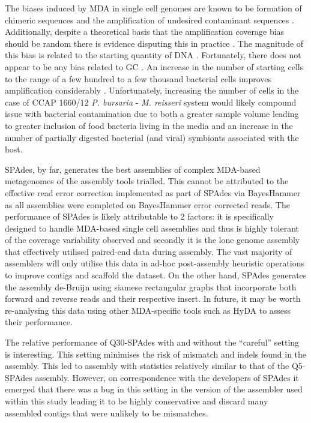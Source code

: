 The biases induced by MDA in single cell genomes are known to be 
formation of chimeric sequences and the amplification
of undesired contaminant sequences \citep{Binga2008}.
Additionally, despite a theoretical basis that
the amplification coverage bias should be random \citep{Hosono2003}
there is evidence disputing this in practice \citep{Ellegaard2013}.
The magnitude of this bias is related to the starting
quantity of DNA \citep{Ellegaard2013a}.
Fortunately, there does not appear to be any bias
related to GC \citep{Ellegaard2013a}.
An increase in the number of starting cells to the range of
a few hundred to a few thousand bacterial cells
improves amplification considerably \citep{Ellegaard2013a}. 
Unfortunately, increasing the number of cells in the case
of CCAP 1660/12 \textit{P. bursaria} - \textit{M. reisseri} system
would likely compound issue with bacterial contamination due 
to both a greater sample volume leading to greater inclusion
of food bacteria living in the media and an increase in the
number of partially digested bacterial (and viral) symbionts
associated with the host. 

SPAdes, by far, generates the best assemblies of complex
MDA-based metagenomes of the assembly tools trialled. 
This cannot be attributed to the effective read error correction
implemented as part of SPAdes via BayesHammer as all assemblies
were completed on BayesHammer error corrected reads. The performance
of SPAdes is likely attributable to 2 factors: it is specifically
designed to handle MDA-based single cell assemblies and thus is 
highly tolerant of the coverage variability observed and secondly
it is the lone genome assembly that effectively utilised
paired-end data during assembly.  The vast majority of assemblers
will only utilise this data in ad-hoc post-assembly heuristic operations
to improve contigs and scaffold the dataset.  On the other hand,
SPAdes generates the assembly de-Bruijn using siamese rectangular
graphs that incorporate both forward and reverse reads and their 
respective insert. 
In future, it may be worth re-analysing this data using
other MDA-specific tools such as HyDA to assess their performance. 

The relative performance of Q30-SPAdes with and without the ``careful''
setting is interesting. This setting minimises the risk of mismatch and indels
found in the assembly.  This led to assembly with statistics relatively similar
to that of the Q5-SPAdes assembly.   However, on correspondence with the developers
of SPAdes it emerged that there was a bug in this setting in the version
of the assembler used within this study leading it to be highly conservative
and discard many assembled contigs that were unlikely to be mismatches. 



